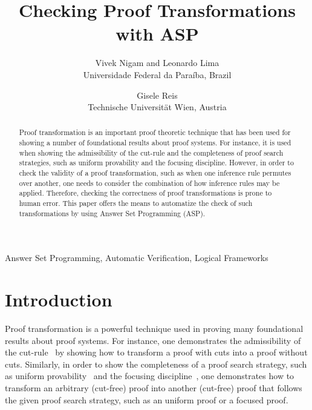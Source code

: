 \documentclass{new_tlp}
\title[International Conference on Logic Programming]
        {Checking Proof Transformations with ASP}
\author[Vivek Nigam, Leonardo Lima and Gisele Reis]
         {Vivek Nigam and Leonardo Lima\\
         Universidade Federal da Para\'iba, Brazil\\
         \email{\{vivek.nigam, leonardo.alfs\}@gmail.com} 
         \and 
         Gisele Reis\\
         Technische Universit\"at Wien, Austria\\
         \email{giselle@logic.at}}
\begin{document}

\maketitle

  \begin{abstract}
  Proof transformation is an important proof theoretic technique that has
been used for showing a number of foundational results about proof
systems. For instance, it is used when showing the admissibility of the
cut-rule and the completeness of proof search strategies, such as uniform
provability and the focusing discipline. However, in order to check the
validity of a proof transformation, such as when one inference
rule permutes over another, one needs to consider the combination of how 
inference rules may be applied. Therefore, checking the correctness of proof
transformations is prone to human error. This paper offers the means to
automatize the check of such transformations by using Answer Set Programming (ASP). 
  \end{abstract}

  \begin{keywords}
    Answer Set Programming, Automatic Verification, Logical Frameworks
  \end{keywords}


\section{Introduction}
Proof transformation is a powerful technique used in proving many
foundational results about proof systems. For instance, one demonstrates
the admissibility of the cut-rule~\cite{gentzen35} by showing
how to transform a proof with cuts into a proof without cuts.
Similarly, in order to show the completeness of a proof search strategy,
such as uniform provability~\cite{miller91apal}  and the focusing
discipline~\cite{andreoli92jlc}, one demonstrates how to transform an
arbitrary (cut-free) proof into another (cut-free) proof that follows the
given proof search strategy, such as an uniform proof or a focused proof. 
\end{document}
